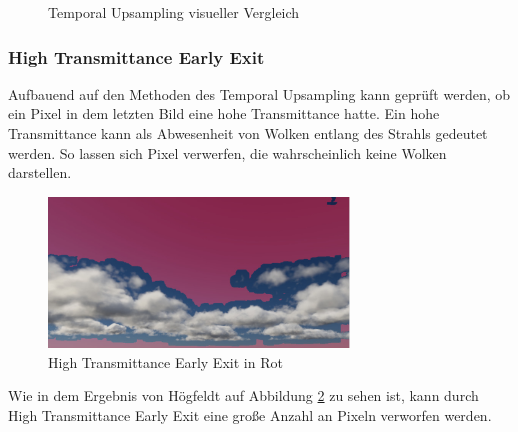 \begin{figure}[H]
    \centering
    \qquad
    \caption{Temporal Upsampling visueller Vergleich \cite{Högfeldt16}}
    \label{fig:temporal-upsampling}
\end{figure}

\subsubsection{High Transmittance Early Exit}
Aufbauend auf den Methoden des Temporal Upsampling kann geprüft werden, ob ein Pixel in dem letzten Bild eine hohe Transmittance hatte. Ein hohe Transmittance kann als Abwesenheit von Wolken entlang des Strahls gedeutet werden. So lassen sich Pixel verwerfen, die wahrscheinlich keine Wolken darstellen.

\begin{figure}[H]
    \centering
    \includegraphics[width=8cm]{media/htee.png}
    \caption{High Transmittance Early Exit in Rot \cite{Högfeldt16}}
    \label{fig:htee}
\end{figure}

Wie in dem Ergebnis von Högfeldt \cite{Högfeldt16} auf Abbildung \ref{fig:htee} zu sehen ist, kann durch High Transmittance Early Exit eine große Anzahl an Pixeln verworfen werden.

